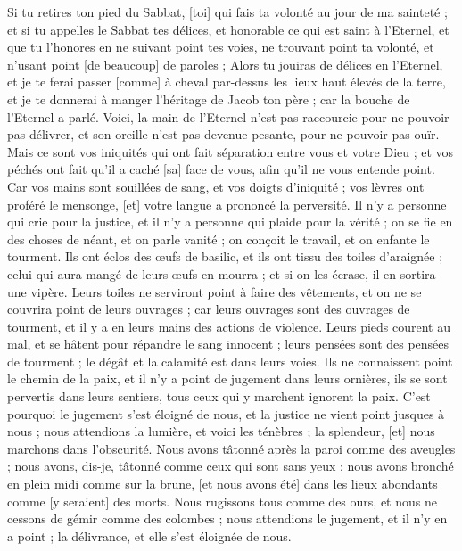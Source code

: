 \begin{multicols}{2}
Si tu retires ton pied du Sabbat, [toi] qui fais ta volonté au jour de ma sainteté ; et si tu appelles le Sabbat tes délices, et honorable ce qui est saint à l'Eternel, et que tu l'honores en ne suivant point tes voies, ne trouvant point ta volonté, et n'usant point [de beaucoup] de paroles ;
Alors tu jouiras de délices en l'Eternel, et je te ferai passer [comme] à cheval par-dessus les lieux haut élevés de la terre, et je te donnerai à manger l'héritage de Jacob ton père ; car la bouche de l'Eternel a parlé.
\VerseOne{}Voici, la main de l'Eternel n'est pas raccourcie pour ne pouvoir pas délivrer, et son oreille n'est pas devenue pesante, pour ne pouvoir pas ouïr.
Mais ce sont vos iniquités qui ont fait séparation entre vous et votre Dieu ; et vos péchés ont fait qu'il a caché [sa] face de vous, afin qu'il ne vous entende point.
Car vos mains sont souillées de sang, et vos doigts d'iniquité ; vos lèvres ont proféré le mensonge, [et] votre langue a prononcé la perversité.
Il n'y a personne qui crie pour la justice, et il n'y a personne qui plaide pour la vérité ; on se fie en des choses de néant, et on parle vanité ; on conçoit le travail, et on enfante le tourment.
Ils ont éclos des œufs de basilic, et ils ont tissu des toiles d'araignée ; celui qui aura mangé de leurs œufs en mourra ; et si on les écrase, il en sortira une vipère.
Leurs toiles ne serviront point à faire des vêtements, et on ne se couvrira point de leurs ouvrages ; car leurs ouvrages sont des ouvrages de tourment, et il y a en leurs mains des actions de violence.
Leurs pieds courent au mal, et se hâtent pour répandre le sang innocent ; leurs pensées sont des pensées de tourment ; le dégât et la calamité est dans leurs voies.
Ils ne connaissent point le chemin de la paix, et il n'y a point de jugement dans leurs ornières, ils se sont pervertis dans leurs sentiers, tous ceux qui y marchent ignorent la paix.
C'est pourquoi le jugement s'est éloigné de nous, et la justice ne vient point jusques à nous ; nous attendions la lumière, et voici les ténèbres ; la splendeur, [et] nous marchons dans l'obscurité.
Nous avons tâtonné après la paroi comme des aveugles ; nous avons, dis-je, tâtonné comme ceux qui sont sans yeux ; nous avons bronché en plein midi comme sur la brune, [et nous avons été] dans les lieux abondants comme [y seraient] des morts.
Nous rugissons tous comme des ours, et nous ne cessons de gémir comme des colombes ; nous attendions le jugement, et il n'y en a point ; la délivrance, et elle s'est éloignée de nous.

\end{multicols}
